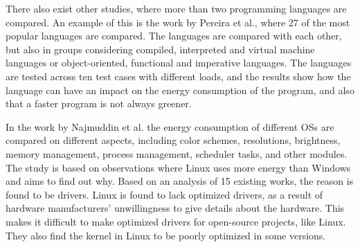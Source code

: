 There also exist other studies, where more than two programming languages are compared. An example of this is the work by Pereira et al.\cite[]{Pereira2017}, where 27 of the most popular languages are compared. The languages are compared with each other, but also in groups considering compiled, interpreted and virtual machine languages or object-oriented, functional and imperative languages. The languages are tested across ten test cases with different loads, and the results show how the language can have an impact on the energy consumption of the program, and also that a faster program is not always greener.\newline

In the work by Najmuddin et al.\cite[]{Najmuddin2021} the energy consumption of different OSs are compared on different aspects, including color schemes, resolutions, brightness, memory management, process management, scheduler tasks, and other modules. The study is based on observations where Linux uses more energy than Windows and aims to find out why. Based on an analysis of 15 existing works, the reason is found to be drivers. Linux is found to lack optimized drivers, as a result of hardware manufacturers' unwillingness to give details about the hardware. This makes it difficult to make optimized drivers for open-source projects, like Linux. They also find the kernel in Linux to be poorly optimized in some versions.